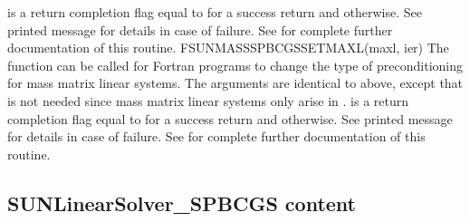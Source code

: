 {
   is a  return completion flag equal to  for a success
  return and  otherwise. See printed message for details in case
  of failure.
}
{
  See  for complete further
  documentation of this routine.
}
%
%
{
  FSUNMASSSPBCGSSETMAXL(maxl, ier)
}
{
  The function  can be called for Fortran
  programs to change the type of preconditioning for mass matrix
  linear systems.
}
{
  The arguments are identical to  above, except that
   is not needed since mass matrix linear systems only arise
  in {\arkode}.
}
{
   is a  return completion flag equal to  for a success
  return and  otherwise. See printed message for details in case
  of failure.
}
{
  See  for complete further
  documentation of this routine.
}
%
%

\subsection{SUNLinearSolver\_SPBCGS content}
\label{ss:sunlinsol_spbcgs_content}

